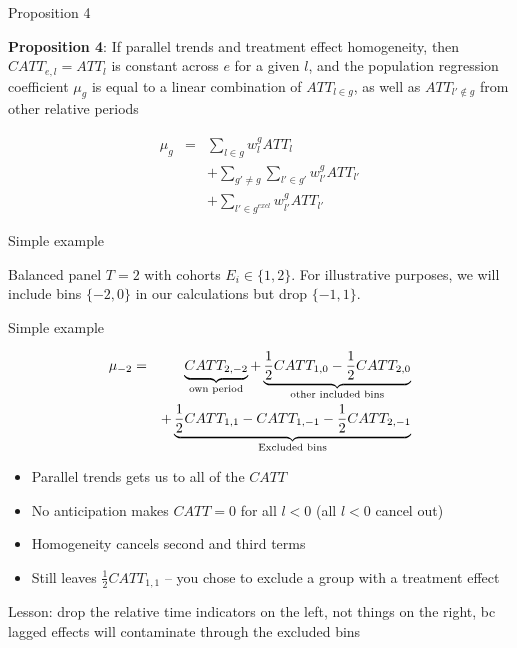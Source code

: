 \documentclass{beamer}
\begin{document}
\begin{frame}{Proposition 4}

\textbf{Proposition 4}: If parallel trends and treatment effect homogeneity, then $CATT_{e,l}=ATT_l$ is constant across $e$ for a given $l$, and the population regression coefficient $\mu_g$ is equal to a linear combination of $ATT_{l \in g}$, as well as $ATT_{l' \notin g}$ from other relative periods

\begin{eqnarray*}
\mu_g &=& \sum_{l \in g} w^g_l ATT_l \\
&&+ \sum_{g' \neq g} \sum_{l' \in g'} w^g_{l'} ATT_{l'} \\
&&+ \sum_{l' \in g^{excl}} w^g_{l'}ATT_{l'}
\end{eqnarray*}


\end{frame}

\begin{frame}{Simple example}


Balanced panel $T=2$ with cohorts $E_i \in \{1,2 \}$. For illustrative purposes, we will include bins $\{-2,0\}$ in our calculations but drop $\{-1,1\}$. 


\end{frame}

\begin{frame}{Simple example}

\begin{eqnarray*}
\mu_{-2} &=& \underbrace{CATT_{2,-2}}_{\mathclap{\text{own period}}} + \underbrace{\frac{1}{2}CATT_{1,0} - \frac{1}{2} CATT_{2,0}}_{\mathclap{\text{other included bins}}} \\
&&+ \underbrace{ \frac{1}{2} CATT_{1,1} - CATT_{1,-1} - \frac{1}{2} CATT_{2,-1} }_{\mathclap{\text{Excluded bins}}}
\end{eqnarray*}

\begin{itemize}
\item Parallel trends gets us to all of the $CATT$
\item No anticipation makes $CATT=0$ for all $l<0$ (all $l<0$ cancel out)
\item Homogeneity cancels second and third terms
\item Still leaves $\frac{1}{2} CATT_{1,1}$ -- you chose  to exclude a group with a treatment effect
\end{itemize}Lesson: drop the relative time indicators on the left, not things on the right, bc lagged effects will contaminate through the excluded bins


\end{frame}
\end{document}
